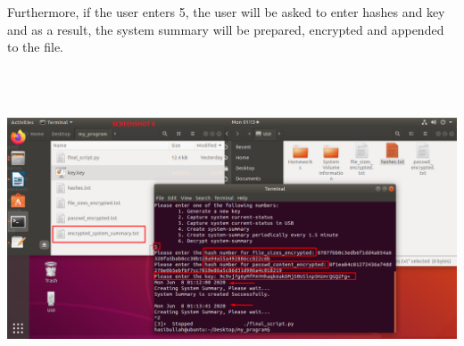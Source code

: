 \documentclass{article} %
\begin{document}
\noindent 

\noindent 

\noindent 

\noindent 

\noindent 

\noindent 

\noindent 

\noindent 

\noindent 

\noindent 

\noindent 

\noindent 

\noindent 

\noindent 

\noindent \newline\newline \newline\newline\newline \newline\newline\newline \newline\newline\newline \newline\newline\newline\newline \newline\newline\newline\newline\newline\newline\newline Furthermore, if the user enters 5, the user will be asked to enter hashes and key and as a result, the system summary will be prepared, encrypted and appended to the file.

\noindent \includegraphics*[width=6in, height=3.73in, keepaspectratio=false]{6.png}
\end{document}
